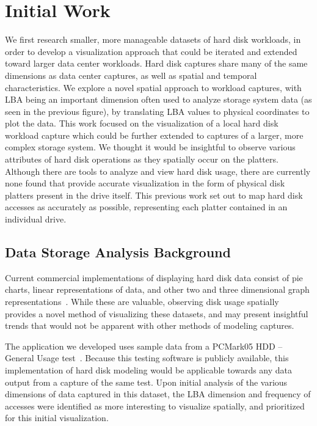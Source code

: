 \documentclass[12pt]{ucthesis}
\begin{document}
\chapter{Initial Work}
\label{initial-work}

We first research smaller, more manageable datasets of hard disk workloads, in order to develop a visualization approach that could be iterated and extended toward larger data center workloads. Hard disk captures share many of the same dimensions as data center captures, as well as spatial and temporal characteristics. We explore a novel spatial approach to workload captures, with LBA being an important dimension often used to analyze storage system data (as seen in the previous figure), by translating LBA values to physical coordinates to plot the data. This work focused on the visualization of a local hard disk workload capture which could be further extended to captures of a larger, more complex storage system. We thought it would be insightful to observe various attributes of hard disk operations as they spatially occur on the platters. Although there are tools to analyze and view hard disk usage, there are currently none found that provide accurate visualization in the form of physical disk platters present in the drive itself. This previous work set out to map hard disk accesses as accurately as possible, representing each platter contained in an individual drive.


\section{Data Storage Analysis Background}
\label{background}

Current commercial implementations of displaying hard disk data consist of pie charts, linear representations of data, and other two and three dimensional graph representations~\cite{internal:requirements}. While these are valuable, observing disk usage spatially provides a novel method of visualizing these datasets, and may present insightful trends that would not be apparent with other methods of modeling captures.

The application we developed uses sample data from a PCMark05 HDD – General Usage test~\cite{pcmark:whitepaper}. Because this testing software is publicly available, this implementation of hard disk modeling would be applicable towards any data output from a capture of the same test. Upon initial analysis of the various dimensions of data captured in this dataset, the LBA dimension and frequency of accesses were identified as more interesting to visualize spatially, and prioritized for this initial visualization.
\end{document}
